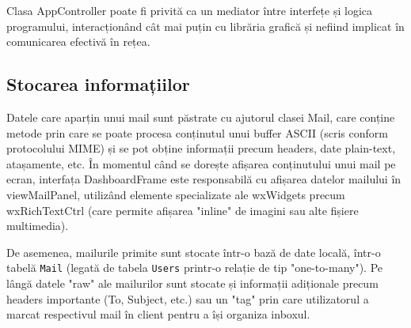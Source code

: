 \documentclass[runningheads]{llncs}
\begin{document}
Clasa AppController poate fi privită ca un mediator între interfețe și logica programului, interacționând cât mai puțin cu librăria grafică și nefiind implicat în comunicarea efectivă în rețea.


\subsection{Stocarea informațiilor}

Datele care aparțin unui mail sunt păstrate cu ajutorul clasei Mail, care conține metode prin care se poate procesa conținutul unui buffer ASCII (scris conform protocolului MIME) și se pot obține informații precum headers, date plain-text, atașamente, etc. În momentul când se dorește afișarea conținutului unui mail pe ecran, interfața DashboardFrame este responsabilă cu afișarea datelor mailului în viewMailPanel, utilizând elemente specializate ale wxWidgets precum wxRichTextCtrl (care permite afișarea "inline" de imagini sau alte fișiere multimedia).

De asemenea, mailurile primite sunt stocate într-o bază de date locală, într-o tabelă \texttt{Mail} (legată de tabela \texttt{Users} printr-o relație de tip "one-to-many"). Pe lângă datele "raw" ale mailurilor sunt stocate și informații adiționale precum headers importante (To, Subject, etc.) sau un "tag" prin care utilizatorul a marcat respectivul mail în client pentru a își organiza inboxul.
\end{document}
